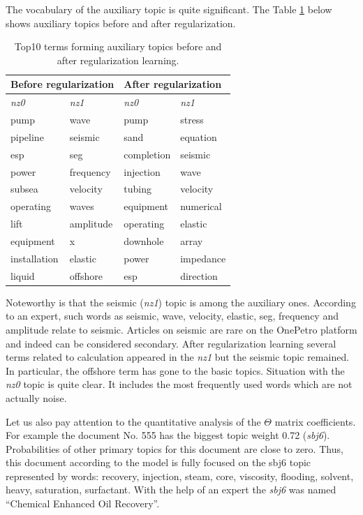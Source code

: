 \documentclass[12pt]{report}
\theoremstyle{definition}
\begin{document}
The vocabulary of the auxiliary topic is quite significant. The Table \ref{tab:op1} below shows auxiliary topics before and after regularization.

\begin{table}[tbp]
	\centering
	\caption{Top10 terms forming auxiliary topics before and after regularization learning.}
	\label{tab:op1}
	\begin{tabular}{|l|l|l|l|}
		\hline
		\multicolumn{2}{|l|}{\textbf{Before regularization}} & \multicolumn{2}{l|}{\textbf{After regularization}} \\ \hline
		\textit{nz0} & \textit{nz1} & \textit{nz0} & \textit{nz1} \\ \hline
		pump & wave & pump & stress \\ \hline
		pipeline & seismic & sand & equation \\ \hline
		esp & seg & completion & seismic \\ \hline
		power & frequency & injection & wave \\ \hline
		subsea & velocity & tubing & velocity \\ \hline
		operating & waves & equipment & numerical \\ \hline
		lift & amplitude & operating & elastic \\ \hline
		equipment & x & downhole & array \\ \hline
		installation & elastic & power & impedance \\ \hline
		liquid & offshore & esp & direction \\ \hline
	\end{tabular}
\end{table}

Noteworthy is that the seismic (\textit{nz1}) topic is among the auxiliary ones. 
According to an expert, such words as seismic, wave, velocity, elastic, seg, frequency and amplitude relate to seismic.
Articles on seismic are rare on the OnePetro platform and indeed can be considered secondary. 
After regularization learning several terms related to calculation appeared in the \textit{nz1} but the seismic topic remained.
In particular, the offshore term has gone to the basic topics. 
Situation with the \textit{nz0} topic is quite clear. 
It includes the most frequently used words which are not actually noise.

Let us also pay attention to the quantitative analysis of the $\Theta$ matrix coefficients. 
For example the document No. 555 has the biggest topic weight 0.72 (\textit{sbj6}).
Probabilities of other primary topics for this document are close to zero. 
Thus, this document according to the model is fully focused on the sbj6 topic represented by words: recovery, injection, steam, core, viscosity, flooding, solvent, heavy, saturation, surfactant. 
With the help of an expert the \textit{sbj6} was named ``Chemical Enhanced Oil Recovery''.
\end{document}
